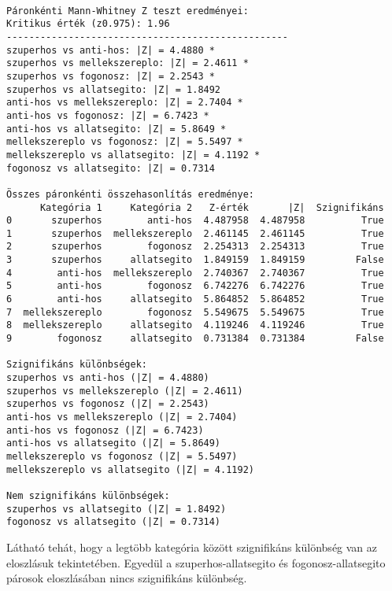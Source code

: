 \documentclass[11pt]{article}
\begin{document}
    \begin{Verbatim}[commandchars=\\\{\}]

Páronkénti Mann-Whitney Z teszt eredményei:
Kritikus érték (z0.975): 1.96
--------------------------------------------------
szuperhos vs anti-hos: |Z| = 4.4880 *
szuperhos vs mellekszereplo: |Z| = 2.4611 *
szuperhos vs fogonosz: |Z| = 2.2543 *
szuperhos vs allatsegito: |Z| = 1.8492
anti-hos vs mellekszereplo: |Z| = 2.7404 *
anti-hos vs fogonosz: |Z| = 6.7423 *
anti-hos vs allatsegito: |Z| = 5.8649 *
mellekszereplo vs fogonosz: |Z| = 5.5497 *
mellekszereplo vs allatsegito: |Z| = 4.1192 *
fogonosz vs allatsegito: |Z| = 0.7314

Összes páronkénti összehasonlítás eredménye:
      Kategória 1     Kategória 2   Z-érték       |Z|  Szignifikáns
0       szuperhos        anti-hos  4.487958  4.487958          True
1       szuperhos  mellekszereplo  2.461145  2.461145          True
2       szuperhos        fogonosz  2.254313  2.254313          True
3       szuperhos     allatsegito  1.849159  1.849159         False
4        anti-hos  mellekszereplo  2.740367  2.740367          True
5        anti-hos        fogonosz  6.742276  6.742276          True
6        anti-hos     allatsegito  5.864852  5.864852          True
7  mellekszereplo        fogonosz  5.549675  5.549675          True
8  mellekszereplo     allatsegito  4.119246  4.119246          True
9        fogonosz     allatsegito  0.731384  0.731384         False

Szignifikáns különbségek:
szuperhos vs anti-hos (|Z| = 4.4880)
szuperhos vs mellekszereplo (|Z| = 2.4611)
szuperhos vs fogonosz (|Z| = 2.2543)
anti-hos vs mellekszereplo (|Z| = 2.7404)
anti-hos vs fogonosz (|Z| = 6.7423)
anti-hos vs allatsegito (|Z| = 5.8649)
mellekszereplo vs fogonosz (|Z| = 5.5497)
mellekszereplo vs allatsegito (|Z| = 4.1192)

Nem szignifikáns különbségek:
szuperhos vs allatsegito (|Z| = 1.8492)
fogonosz vs allatsegito (|Z| = 0.7314)
    \end{Verbatim}

    Látható tehát, hogy a legtöbb kategória között szignifikáns különbség
van az eloszlásuk tekintetében. Egyedül a szuperhos-allatsegito és
fogonosz-allatsegito párosok eloszlásában nincs szignifikáns különbség.


    
    
    
\end{document}
